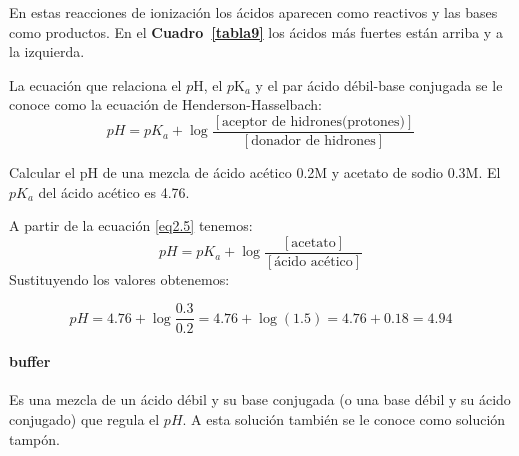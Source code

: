  En estas reacciones de ionizaci\'on los \'acidos aparecen como reactivos y las bases como productos.
 En el \textbf{Cuadro~\ref{tabla9}} los \'acidos m\'as fuertes est\'an arriba y a la izquierda.

La ecuaci\'on que relaciona el $p$H, el $p$K$_a$  y el par
\'acido d\'ebil-base conjugada se le conoce como la ecuaci\'on de
Henderson-Hasselbach:
\begin{equation}
pH = pK_a + \log
\frac{[\textrm{aceptor de hidrones(protones)}]}
{[\textrm{donador de hidrones}]}
\label{eq2.5}
\end{equation}

\begin{example}
 Calcular el pH de una mezcla de \'acido ac\'etico 0.2M y acetato de sodio 0.3M. El $pK_a$ del \'acido ac\'etico es 4.76.

A partir de la ecuaci\'on \ref{eq2.5} tenemos:
$$ pH = pK_a + \log \frac{[\textrm{acetato}]}{{[\textrm{
\'acido ac\'etico}]}}$$ Sustituyendo los valores obtenemos:

$$pH = 4.76 + \log \frac{0.3}{0.2} = 4.76 + \log(1.5) = 4.76 +
0.18=4.94$$
\end{example}

\paragraph{\gls{buffer}}Es una mezcla de un \'acido d\'ebil y su base conjugada (o una base d\'e\-bil y su \'acido conjugado) que regula el $pH$. A esta soluci\'on tambi\'en se le conoce como soluci\'on tamp\'on.

